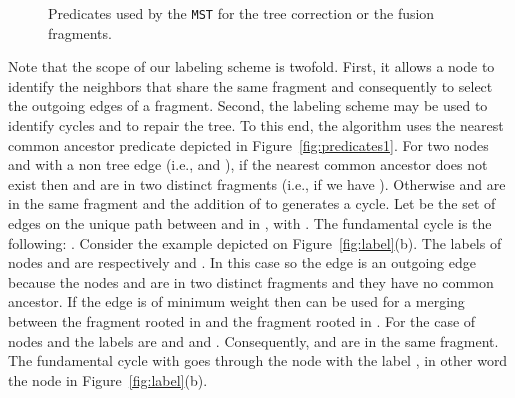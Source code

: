 \documentclass[11pt,a4paper]{article}
\newcommand{\Lca}{\mbox{\rm }}
\newcommand{\MST}{\mbox{\tt MST}}
\begin{document}
\begin{figure}[!ht]
\fbox{
\begin{minipage}{15cm}
\begin{description}
\item[-] \item[-] \item[-] 
\item[-] \item[-] \item[-]  \\
\hspace*{8cm}\\
\item[-] \item[-] 
\item[-] 

\item[-] \item[-] \item[-] 

\item[-] 
\end{description}
\end{minipage}
}
\caption{Predicates used by the \MST\/ for the tree correction or the fusion fragments.}
\label{fig:predicates2}
\end{figure}

Note that the scope of our labeling scheme is twofold. First, it
allows a node to identify the neighbors that share the same fragment
and consequently to select the outgoing edges of a fragment. 
Second, the labeling scheme may be used to identify cycles and
to repair the tree. To this end, the algorithm uses the nearest common
ancestor predicate  \Lca\/ depicted 
in Figure~\ref{fig:predicates1}. For two nodes  and  with
 a non tree edge (i.e.,  and
), if the nearest common ancestor does not exist then
 and  are in two distinct fragments (i.e., if we have ). Otherwise  and  are in the
same fragment  and the addition of  to  generates a
cycle. Let  be the set of edges on the
unique path between  and  in 
, with . The fundamental cycle 
 is the following: . 
Consider the example depicted on  Figure~\ref{fig:label}(b).
The labels of nodes  and  are respectively   and
. In this case  so the edge
 is an outgoing edge because the nodes  and  are in two distinct fragments and they have no common ancestor. If the edge  is of minimum weight then
 can be used for a merging 
between the fragment rooted in  and the fragment rooted in . 
For the case of nodes  and  the labels are 
and  and 
. Consequently,  and  are in the same fragment. 
The fundamental cycle  with  goes through the node with
the label , in other word 
the node  in Figure~\ref{fig:label}(b).
 
\end{document}
